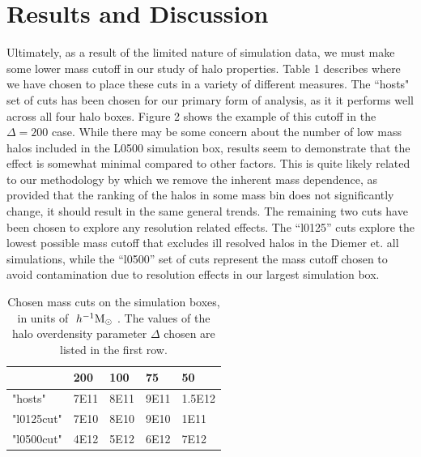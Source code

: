 \documentclass[usenatbib,usegraphicx,letterpaper]{mn2e}
\begin{document}
\section[]{Results and Discussion}
\label{section:results}

Ultimately, as a result of the limited nature of simulation data, we must make some lower mass cutoff in our study of halo properties. Table 1 describes where we have chosen to place these cuts in a variety of different measures. The ``hosts" set of cuts has been chosen for our primary form of analysis, as it it performs well across all four halo boxes. Figure 2 shows the example of this cutoff in the $\Delta = 200$ case. While there may be some concern about the number of low mass halos included in the L0500 simulation box, results seem to demonstrate that the effect is somewhat minimal compared to other factors. This is quite likely related to our methodology by which we remove the inherent mass dependence, as provided that the ranking of the halos in some mass bin does not significantly change, it should result in the same general trends. The remaining two cuts have been chosen to explore any resolution related effects. The ``l0125'' cuts explore the lowest possible mass cutoff that excludes ill resolved halos in the Diemer et. all simulations, while the ``l0500'' set of cuts represent the mass cutoff chosen to avoid contamination due to resolution effects in our largest simulation box.

\begin{table}[]
\centering
\caption{Chosen mass cuts on the simulation boxes, in units of $\ h^{-1}\mathrm{M}_{\odot}~$. The values of the halo overdensity parameter $\Delta$ chosen are listed in the first row.}
\label{my-label}
\begin{tabular}{l | l | l | l | l}
           & 200  & 100  & 75   & 50     \\ \hline
"hosts"    & 7E11 & 8E11 & 9E11 & 1.5E12 \\
"l0125cut" & 7E10 & 8E10 & 9E10 & 1E11   \\
"l0500cut" & 4E12 & 5E12 & 6E12 & 7E12  
\end{tabular}
\end{table}
\end{document}
